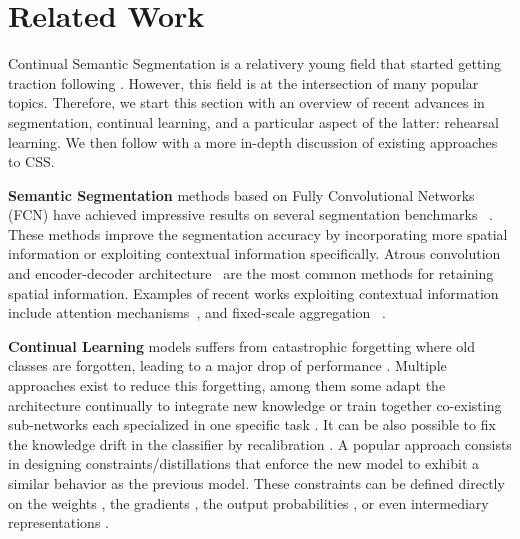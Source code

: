 \section{Related Work}

Continual Semantic Segmentation is a relativery young field that started getting traction following
\citep{michieli2019ilt,cermelli2020modelingthebackground}. However, this field is at the intersection
of many popular topics. Therefore, we start this section with an overview of recent advances in
segmentation, continual learning, and a particular aspect of the latter: rehearsal learning. We then
follow with a more in-depth discussion of existing approaches to CSS.

\noindent\textbf{Semantic Segmentation} methods based on Fully Convolutional Networks (FCN)
\citep{long2015fcn,sermanet2014overfeat} have achieved impressive results on several segmentation
benchmarks ~\citep{everingham2015pascalvoc,
    cordts2016cityscapes,zhou2017adedataset,caesar2018cocoostuff}. These methods improve the
segmentation accuracy by incorporating more spatial information or exploiting contextual information
specifically. Atrous convolution~\citep{chen2018deeplab,mehta2018espnet} and encoder-decoder
architecture~\citep{ronneberger2015UNet,noh2015deconvolution,badrinarayanan2017segnet} are the most
common methods for retaining spatial information. Examples of recent works exploiting contextual
information include attention
mechanisms~\citep{yuan2018ocnet,zhao2018psanet,fu2019DANet,huang2019CCNet,yuan2020ocr,tao2020HRNet,zhang2020resnest},
and fixed-scale aggregation
~\citep{zhao2017PSPNet,chen2018deeplab,chen2018ZPSA,zhang2018ContextEncoding}.

\noindent\textbf{Continual Learning} models suffers from catastrophic forgetting where old classes
are forgotten, leading to a major drop of performance
\citep{robins1995catastrophicforgetting,thrun1998lifelonglearning,french1999catastrophicforgetting}.
Multiple approaches exist to reduce this forgetting, among them some adapt the architecture
continually to integrate new knowledge
\citep{yoon2018dynamically_expandable_networks,li2019learning_to_grow,yan2021der} or train together
co-existing sub-networks \citep{frankle2019lottery_ticket} each specialized in one specific task
\citep{fernando2017path_net,golkar2019neural_pruning, hung2019cpg}. It can be also possible to fix
the knowledge drift in the classifier by recalibration
\citep{wu2019bias_correction,zhao2020weightalignement,belouadah2019il2m,belouadah2020scail}. A
popular approach consists in designing constraints/distillations that enforce the new model to
exhibit a similar behavior as the previous model. These constraints can be defined directly on the
weights
\citep{kirkpatrick2017ewc,aljundi2018MemoryAwareSynapses,chaudhry2018riemannien_walk,zenke2017synaptic_intelligence},
the gradients \citep{lopezpaz2017gem,chaudhry2019AGEM}, the output probabilities
\citep{li2018lwf,rebuffi2017icarl,castro2018end_to_end_inc_learn,cermelli2020modelingthebackground},
or even intermediary representations
\citep{hou2019ucir,dhar2019learning_without_memorizing_gradcam,peng2019m2kd,douillard2020podnet}.

